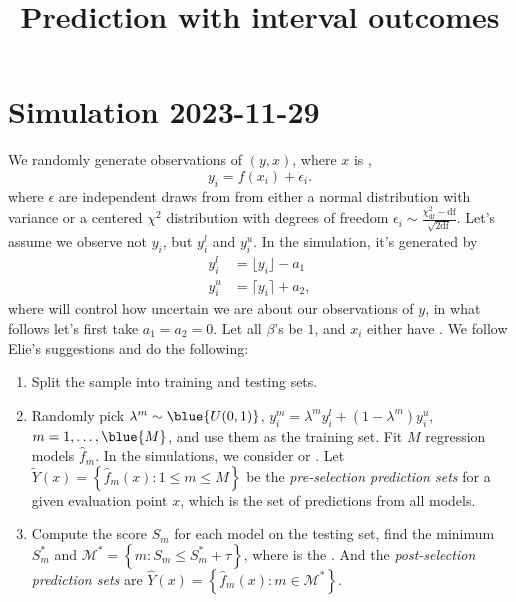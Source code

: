 \documentclass[12pt]{article}
\newcommand{\cqty}[1]{\left\{ #1 \right\}}
\begin{document}
    \title{Prediction with interval outcomes}\author{}\date{}\maketitle

    \section{Simulation 2023-11-29}

    We randomly generate  observations of \((y,x)\), where \(x\) is ,
    \begin{equation*}
        y_{i} = f(x_{i}) + \epsilon_{i}.
    \end{equation*}
    where \(\epsilon\) are independent draws from from either a normal distribution with variance  or a centered \(\chi^{2}\) distribution with  degrees of freedom \(\epsilon_{i} \sim \frac{\chi^{2}_{\text{df}} - \text{df}}{\sqrt{2 \text{df}}}\). 
    Let's assume we observe not \(y_{i}\), but \(y^{l}_{i}\) and \(y_{i}^{u}\). In the simulation, it's generated by 
    \begin{align*}
        y_{i}^{l} &= \lfloor y_{i} \rfloor - a_{1} \\
        y_{i}^{u} &= \lceil y_{i} \rceil  + a_{2},
    \end{align*}
    where  will control how uncertain we are about our observations of \(y\), in what follows let's first take \(a_{1} = a_{2} = 0\). Let all \(\beta\)'s be \(1\), and \(x_{i}\) either have . We follow Elie's suggestions and do the following:
    \begin{enumerate}
        \item Split the sample into training and testing sets. 
        \item Randomly pick \(\lambda^{m} \sim \blue{U(0,1)}\),  \(y^{m}_{i} = \lambda^{m}y^{l}_{i} + (1 - \lambda^{m}) y^{u}_{i}\), \(m = 1,\dots, \blue{M}\), and use them as the training set. Fit \(M\) regression models \(\hat{f}_{m}\). In the simulations, we consider  or . Let \(\tilde{Y}(x) = \left\{\hat{f}_{m}(x): 1\leq m\leq M\right\}\) be the \textit{pre-selection prediction sets} for a given evaluation point \(x\), which is the set of predictions from all models.
        \item Compute the score \(S_{m}\) for each model on the testing set, find the  minimum \(S_{m}^{*}\) and \(\mathcal{M}^{*} = \cqty{m: S_{m} \leq S_{m}^{*} + \tau}\), where  is the . And the \textit{post-selection prediction sets} are \(\hat{Y}(x) = \cqty{\hat{f}_{m}(x): m\in \mathcal{M}^{*}}\).
    \end{enumerate}
\end{document}
